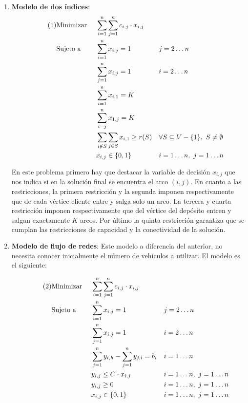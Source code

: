 \documentclass[a4paper,11pt]{article}
\newcommand\numberthis{							%
	\addtocounter{equation}{1}\tag{\theequation}
}
\begin{document}
\begin{enumerate}
\item \textbf{Modelo de dos índices}:
\begin{align*}\numberthis
   	&\textrm{Minimizar }	&& \sum_{i=1}^{n}{ \sum_{j=1}^{n}{c_{i,j} \cdot x_{i,j}} }	&& \\
   	&\textrm{Sujeto a }		&& \sum_{i=1}^{n}{x_{i,j}} = 1	&& j=2 \ldots n	\\
    &						&& \sum_{j=1}^{n}{x_{i,j}} = 1	&& i=2 \ldots n	\\
	&						&& \sum_{i=1}^{n}{x_{i,1}} = K	&& \\
    &						&& \sum_{i=j}^{n}{x_{1,j}} = K	&& \\
    &						&& \sum_{i \notin S}\sum_{j \in S}{x_{i,1}} \geq r(S)		&& \forall S \subseteq V-\{1\}, \ S \neq \emptyset \\
	&						&& x_{i,j} \in \{0,1\}			&& i=1 \ldots n, \ j = 1 \ldots n	\\
\end{align*}

En este problema primero hay que destacar la variable de decisión ${x_{i,j}}$ que nos indica si en la solución final se encuentra el arco ${(i,j)}$. En cuanto a las restricciones, la primera restricción y la segunda imponen respectivamente que de cada vértice cliente entre y salga solo un arco. La tercera y cuarta restricción imponen respectivamente que del vértice del depósito entren y salgan exactamente ${K}$ arcos. Por último la quinta restricción garantiza que se cumplan las restricciones de capacidad y la conectividad de la solución.

\item \textbf{Modelo de flujo de redes}: Este modelo a diferencia del anterior, no necesita conocer inicialmente el número de vehículos a utilizar. El modelo es el siguiente:

\begin{align*}\numberthis
   	&\textrm{Minimizar }	&& \sum_{i=1}^{n}{ \sum_{j=1}^{n}{c_{i,j} \cdot x_{i,j}} }	&& \\
   	&\textrm{Sujeto a }		&& \sum_{i=1}^{n}{x_{i,j}} = 1	&& j=2 \ldots n	\\
    &						&& \sum_{j=1}^{n}{x_{i,j}} = 1	&& i=2 \ldots n	\\
    &						&& \sum_{j=1}^{n}{y_{i,h}} - \sum_{j=1}^{n}{y_{j,i}} = b_{i}	&& i=1 \ldots n \\
    &						&& y_{i,j} \leq C \cdot x_{i,j}	&& i=1 \ldots n, \ j = 1 \ldots n	\\
    &						&& y_{i,j} \geq 0				&& i=1 \ldots n, \ j = 1 \ldots n	\\
	&						&& x_{i,j} \in \{0,1\}			&& i=1 \ldots n, \ j = 1 \ldots n	\\
\end{align*}


\end{enumerate}
\end{document}
